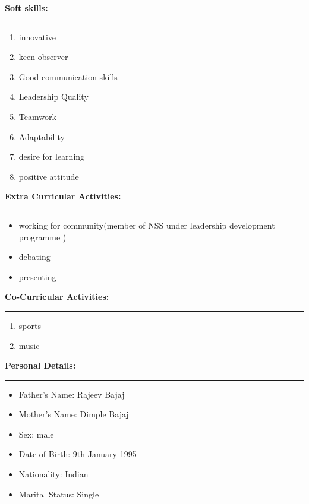 \documentclass[a4paper,10pt]{article}
\begin{document}
\begin{flushleft}
    \newpage
     \textbf{Soft skills:}\\
  \hrule
    \begin{enumerate}
    \item innovative\\
    \item keen observer\\
    	\item Good communication skills\\
    	\item Leadership Quality\\
    	\item Teamwork \\
    	\item Adaptability\\
    	\item  desire for learning\\
    	\item positive attitude\\
    \end{enumerate}
    \textbf{Extra Curricular Activities:}\\
  \hrule
  
   
  
  \begin{itemize}
  	\item working for community(member of NSS under leadership development programme )
  \item debating
   \item presenting
  	
  \end{itemize}
\textbf{Co-Curricular Activities:}\\
  \hrule
  
   
  
  \begin{enumerate}
  
 
  	\item sports
  \item music
  	 \end{enumerate}
  	 \textbf{Personal Details:}\\
   \hrule
   
    \begin{itemize}
    	\item Father's Name:     Rajeev Bajaj\\
    	\item Mother's Name:     Dimple Bajaj\\
    	\item Sex:               male\\
    	
    	\item Date of Birth:     9th January 1995 \\
    	\item Nationality:       Indian\\
    	\item Marital Status:    Single\\
    \end{itemize}
      
   
	\end{flushleft}
	
\end{document}
